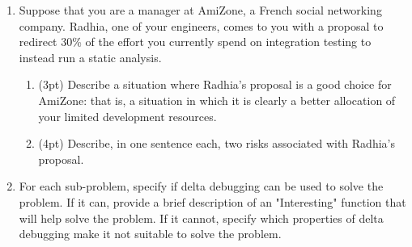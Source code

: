\documentclass{report}
\newif\ifkey
\newcommand{\answerlong}[1]{\ifkey\color{red}\textbf{#1}\color{black}\else\vspace{0.5in}\fi\xspace}
\newcommand*{\pts}[1]{\addtocounter{points}{#1}(#1pt)}
\begin{document}
\begin{spacing}{1.4}
\begin{enumerate}[leftmargin=*]
\begin{enumerate}
  \item \pts{2} Select one of your answers to the previous question. Give a one-sentence justification for why your change
  improves the method's code-level design.

  \answerlong{For 1. above: ``avoid magic numbers'' or ``more self-documenting''. For 2. above: ``radius'' is more descriptive than ``r'', or ``compute'' is a verb, but the method returns a noun-like type.}

  \end{enumerate}

  \item Suppose that you are a manager at AmiZone, a French social networking company. Radhia, one of your engineers, comes to you
    with a proposal to redirect 30\% of the effort you currently spend on integration testing to instead run a static analysis.
\begin{enumerate}
  \item \pts{3} Describe a situation where Radhia's proposal is a good choice for AmiZone: that is, a situation in which it
    is clearly a better allocation of your limited development resources.
    \\
    \answerlong{Answers can vary. ``AmiZone is concerned about security bugs.'' is the shortest, best answer; short answers that
      identify a class of bugs that static analysis is good at will get full credit..}

  \item \pts{4} Describe, in one sentence each, two risks associated with Radhia's proposal.\\
    \answerlong{Any two of the following sentences would be a good answer (other answers are possible).
      Reducing integration testing may increase the risk that bugs at the boundary between modules are not detected.
      Static analysis may produce too many false positive alarms.
      Static analysis may be unsound or may miss bugs (even of the kind it is supposed to find).
      Static analysis errors may be too hard to understand.
    }
    \end{enumerate}

  \item For each sub-problem, specify if delta debugging can be used
    to solve the problem. If it can, provide a brief description of an "Interesting" function that will help solve the problem. If it
    cannot, specify which properties of delta debugging make it not suitable to solve the problem.
    \begin{enumerate}


\end{enumerate}
\end{enumerate}
\end{spacing}
\end{document}
